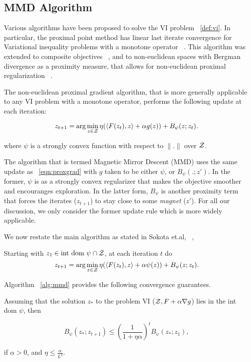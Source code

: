 \subsection{MMD Algorithm}

Various algorithms have been proposed to solve the VI problem~ \ref{def:vi}.
In particular, the proximal point method has linear last iterate convergence for Variational
inequality problems with a monotone operator~ \cite{rockafellarMonotone1976}.
This algorithm was extended to composite objectives~ \cite{tsenglinear1995}, and to non-euclidean
spaces with Bergman divergence as a proximity measure, that allows for non-euclidean proximal
regularization~ \cite{tsengApproximation2010}.

The non-euclidean proximal gradient algorithm, that is more generally applicable to any VI problem
with a monotone operator, performs the following update at each iteration:

\begin{equation}
	\label{eqn:proxgrad} z_{t+1} = \arg \min_{z \in \mathcal{Z}} \eta (\langle F(z_t),
	z\rangle + \alpha g(z)) + B_{\psi} (z; z_t).
\end{equation}

where $\psi$ is a strongly convex function with respect to $\|.\|$ over $\mathcal{Z}$.

The algorithm that is termed Magnetic Mirror Descent (MMD) uses the same update as~
\ref{eqn:proxgrad} with $g$ taken to be either $\psi$, or $B_{\psi}(.
	;z')$.
In the former, $\psi$ is as a strongly convex regularizer that makes the objective smoother and
encouranges exploration.
In the latter form, $B_{\psi}$ is another proximity term that forces the iterates ($z_{t+1}$) to
stay close to some \textit{magnet} ($z'$).
For all our discussion, we only consider the former update rule which is more widely applicable.

We now restate the main algorithm as stated in Sokota et.al,~ \cite{sokotaUnified2023},

\begin{alprocedure}[H]  \label{alg:mmd} Starting with $z_1 \in \text{int dom } \psi \cap \mathcal{Z}$,
	at each iteration $t$ do $$ z_{t+1} = \arg \min_{z \in \mathcal{Z}} \eta (\langle F(z_t), z\rangle +
		\alpha \psi(z)) + B_{\psi} (z; z_t).
	$$
\end{alprocedure}

\hfill \break
Algorithm~
\ref{alg:mmd} provides the following convergence guarantees.
\begin{theorem}
	\label{thm:mmdconv}
	\cite[Theorem 3.4]{sokotaUnified2023}
	Assuming that the solution $z_{\ast}$ to the problem VI ($\mathcal{Z}, F + \alpha \nabla g$) lies in the
	int dom $\psi$, then

	\[ B_{\psi} (z_{\ast}; z_{t + 1}) \leq { \left(\frac{1}{1
				+ \eta \alpha}\right)}^t B_{\psi} (z_{\ast}; z_1), \]

	if $\alpha > 0$, and
	$\eta \leq \frac{\alpha}{L^2}$.
\end{theorem}

